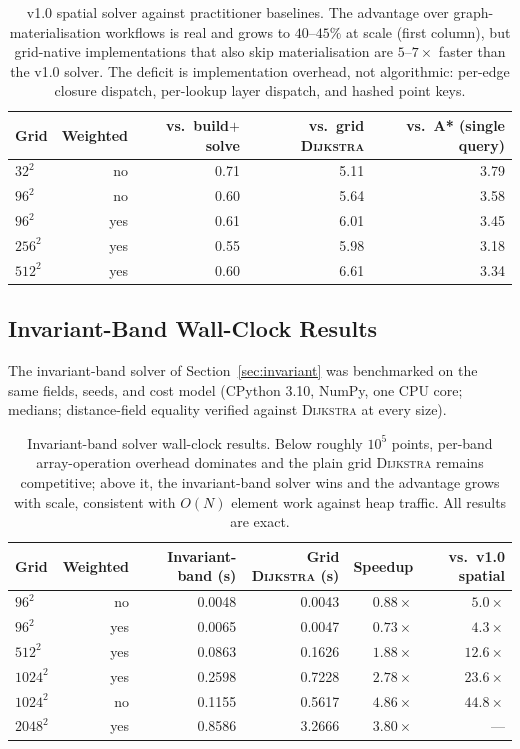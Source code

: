 \documentclass[11pt]{article}
\newcommand{\Dijkstra}{\textsc{Dijkstra}}
\begin{document}
\begin{table}[htbp]
\centering
\begin{tabular}{lrrrr}
\toprule
Grid & Weighted & vs.\ build$+$solve & vs.\ grid \Dijkstra{} & vs.\ A* (single query) \\
\midrule
$32^2$  & no  & 0.71 & 5.11 & 3.79 \\
$96^2$  & no  & 0.60 & 5.64 & 3.58 \\
$96^2$  & yes & 0.61 & 6.01 & 3.45 \\
$256^2$ & yes & 0.55 & 5.98 & 3.18 \\
$512^2$ & yes & 0.60 & 6.61 & 3.34 \\
\bottomrule
\end{tabular}
\caption{v1.0 spatial solver against practitioner baselines. The advantage over graph-materialisation workflows is real and grows to $40$--$45\%$ at scale (first column), but grid-native implementations that also skip materialisation are $5$--$7\times$ faster than the v1.0 solver. The deficit is implementation overhead, not algorithmic: per-edge closure dispatch, per-lookup layer dispatch, and hashed point keys.}
\label{tab:gridnative}
\end{table}

\subsection{Invariant-Band Wall-Clock Results}
\label{sec:invariantresults}

The invariant-band solver of Section~\ref{sec:invariant} was benchmarked on the same fields, seeds, and cost model (CPython 3.10, NumPy, one CPU core; medians; distance-field equality verified against \Dijkstra{} at every size).

\begin{table}[htbp]
\centering
\begin{tabular}{lrrrrr}
\toprule
Grid & Weighted & Invariant-band (s) & Grid \Dijkstra{} (s) & Speedup & vs.\ v1.0 spatial \\
\midrule
$96^2$   & no  & 0.0048 & 0.0043 & $0.88\times$ & $5.0\times$ \\
$96^2$   & yes & 0.0065 & 0.0047 & $0.73\times$ & $4.3\times$ \\
$512^2$  & yes & 0.0863 & 0.1626 & $1.88\times$ & $12.6\times$ \\
$1024^2$ & yes & 0.2598 & 0.7228 & $2.78\times$ & $23.6\times$ \\
$1024^2$ & no  & 0.1155 & 0.5617 & $4.86\times$ & $44.8\times$ \\
$2048^2$ & yes & 0.8586 & 3.2666 & $3.80\times$ & --- \\
\bottomrule
\end{tabular}
\caption{Invariant-band solver wall-clock results. Below roughly $10^5$ points, per-band array-operation overhead dominates and the plain grid \Dijkstra{} remains competitive; above it, the invariant-band solver wins and the advantage grows with scale, consistent with $O(N)$ element work against heap traffic. All results are exact.}
\label{tab:invariantresults}
\end{table}
\end{document}
